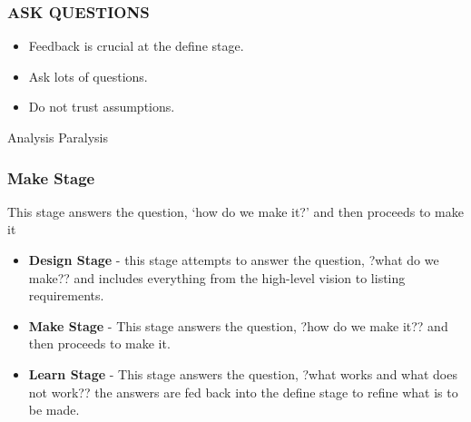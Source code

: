 \begin{frame}
	\frametitle{\textbf{ASK QUESTIONS}}
	\begin{itemize}
		\item Feedback is crucial at the define stage. 
		\item Ask lots of questions.
		\item Do not trust assumptions. 
	\end{itemize}
\end{frame}

\begin{frame}
	\begin{center}
		\Huge{Analysis Paralysis }
	\end{center}
\end{frame}


\begin{frame}
	\frametitle{Make Stage}
	This stage answers the question, `how do we make it?' and then proceeds to make it 
\end{frame}



\begin{frame}
	\begin{itemize}
		\item \textbf{Design Stage} - this stage attempts to answer the question, ?what do we make?? and includes everything from the high-level vision to listing requirements. 
		\item \textbf{Make Stage} - This stage answers the question, ?how do we make it?? and then proceeds to make it. 
		\item \textbf{Learn Stage} - This stage answers the question, ?what works and what does not work?? the answers are fed back into the define stage to refine what is to be made. 
	\end{itemize}
\end{frame}



	


